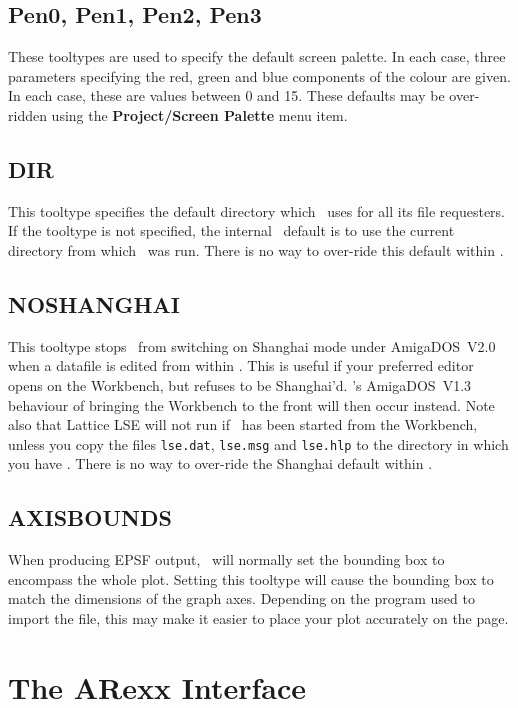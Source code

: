 \section{Pen0, Pen1, Pen2, Pen3}
These tooltypes are used to specify the default screen palette. In each case, three 
parameters specifying the red, green and blue components of the colour are given. In 
each case, these are values between 0 and 15.
These defaults may be over-ridden using the {\bf Project/Screen Palette} menu item.

\section{DIR}
This tooltype specifies the default directory which \amplot\ uses for all its file 
requesters. If the tooltype is not specified, the internal \amplot\ default is to 
use the current directory from which \amplot\ was run.
There is no way to over-ride this default within \amplot.

\section{NOSHANGHAI}
This tooltype stops \amplot\ from switching on Shanghai mode under AmigaDOS~V2.0 
when a datafile is edited from within \amplot. This is useful if your preferred 
editor opens on the Workbench, but refuses to be Shanghai'd. \amplot's AmigaDOS~V1.3
behaviour of bringing the Workbench to the front will then occur instead.
Note also that Lattice LSE will not run if \amplot\ has been started from the 
Workbench, unless you copy the files {\tt lse.dat}, {\tt lse.msg} and 
{\tt lse.hlp} to the directory in which you have \amplot.
There is no way to over-ride the Shanghai default within \amplot.

\section{AXISBOUNDS}
When producing EPSF output, \amplot\ will normally set the bounding box to encompass 
the whole plot. Setting this tooltype will cause the bounding box to match the 
dimensions of the graph axes. Depending on the program used to import the file, this 
may make it easier to place your plot accurately on the page.
   
\chapter{The ARexx Interface}
\label{ch:rxfit}
